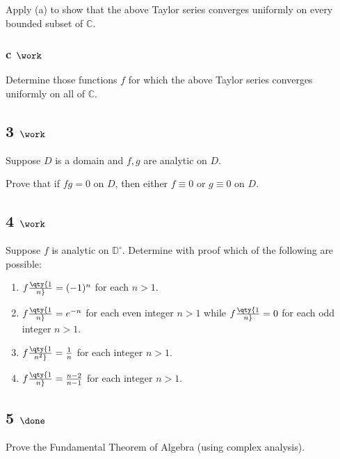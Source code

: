 Apply (a) to show that the above Taylor series converges uniformly on
every bounded subset of \({\mathbb{C}}\).

\hypertarget{c-work-4}{%
\subsubsection{\texorpdfstring{c
\(\work\)}{c \textbackslash work}}\label{c-work-4}}

Determine those functions \(f\) for which the above Taylor series
converges uniformly on all of \({\mathbb{C}}\).

\hypertarget{work-24}{%
\subsection{\texorpdfstring{3
\(\work\)}{3 \textbackslash work}}\label{work-24}}

Suppose \(D\) is a domain and \(f, g\) are analytic on \(D\).

Prove that if \(fg = 0\) on \(D\), then either \(f \equiv 0\) or
\(g\equiv 0\) on \(D\).

\hypertarget{work-25}{%
\subsection{\texorpdfstring{4
\(\work\)}{4 \textbackslash work}}\label{work-25}}

Suppose \(f\) is analytic on \({\mathbb{D}}^\circ\). Determine with
proof which of the following are possible:

\begin{enumerate}
\def\labelenumi{\alph{enumi}.}
\item
  \(f\qty{1\over n} = (-1)^n\) for each \(n>1\).
\item
  \(f\qty{1\over n} = e^{-n}\) for each even integer \(n>1\) while
  \(f\qty{1\over n} = 0\) for each odd integer \(n>1\).
\item
  \(f\qty{1\over n^2} = {1\over n}\) for each integer \(n>1\).
\item
  \(f\qty{1\over n} = {n-2 \over n-1}\) for each integer \(n>1\).
\end{enumerate}

\hypertarget{done-4}{%
\subsection{\texorpdfstring{5
\(\done\)}{5 \textbackslash done}}\label{done-4}}

Prove the Fundamental Theorem of Algebra (using complex analysis).

